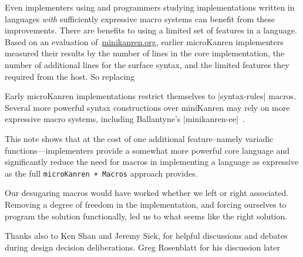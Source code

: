 \documentclass[sigplan,screen,draft,anonymous,review,natbib=false]{acmart}
\begin{document}
Even implementers using and programmers studying implementations
written in languages \emph{with} sufficiently expressive macro systems
can benefit from these improvements. There are benefits to using a
limited set of features in a language. Based on an evaluation
of~\href{minikanren.org}{minikanren.org}, earlier microKanren
implementers measured their results by the number of lines in the core
implementation, the number of additional lines for the surface syntax,
and the limited features they required from the host. So replacing

Early microKanren implementations restrict themselves to
\rackinline|syntax-rules| macros. Several more powerful syntax
constructions over miniKanren may rely on more expressive macro
systems, including Ballantyne's
\rackinline|minikanren-ee|~\cite{ballantyne2020macros}.

This note shows that at the cost of one additional feature--namely
variadic functions---implementers provide a somewhat more powerful
core language and significantly reduce the need for macros in
implementing a language as expressive as the full
\verb|microKanren + Macros| approach provides.

Our desugaring macros would have worked whether we left or right
associated. Removing a degree of freedom in the implementation, and
forcing ourselves to program the solution functionally, led us to what
seems like the right solution.

\begin{acks}

  Thanks also to Ken Shan and Jeremy Siek, for helpful discussions and
  debates during design decision deliberations. Greg Rosenblatt for
  his discussion later

\end{acks}

\printbibliography{}
\end{document}
